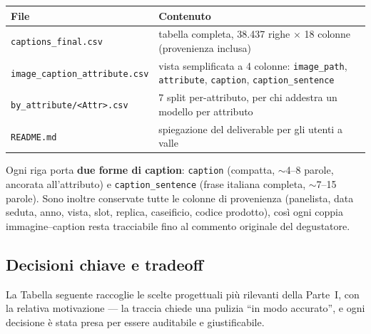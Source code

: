 \documentclass[11pt,a4paper]{article}
\begin{document}
\begin{center}\small
\begin{tabular}{@{}p{4.6cm} p{9.6cm}@{}}
\toprule
\textbf{File} & \textbf{Contenuto} \\
\midrule
\texttt{captions\_final.csv} & tabella completa, 38.437 righe $\times$ 18 colonne (provenienza inclusa) \\
\texttt{image\_caption\_attribute.csv} & vista semplificata a 4 colonne: \texttt{image\_path}, \texttt{attribute}, \texttt{caption}, \texttt{caption\_sentence} \\
\texttt{by\_attribute/<Attr>.csv} & 7 split per-attributo, per chi addestra un modello per attributo \\
\texttt{README.md} & spiegazione del deliverable per gli utenti a valle \\
\bottomrule
\end{tabular}
\end{center}

Ogni riga porta \textbf{due forme di caption}: \texttt{caption} (compatta,
$\sim$4--8 parole, ancorata all'attributo) e \texttt{caption\_sentence} (frase
italiana completa, $\sim$7--15 parole). Sono inoltre conservate tutte le
colonne di provenienza (panelista, data seduta, anno, vista, slot, replica,
caseificio, codice prodotto), cos\`i ogni coppia immagine--caption resta
tracciabile fino al commento originale del degustatore.

\subsection{Decisioni chiave e tradeoff}
La Tabella seguente raccoglie le scelte progettuali pi\`u rilevanti della
Parte~I, con la relativa motivazione --- la traccia chiede una pulizia ``in
modo accurato'', e ogni decisione \`e stata presa per essere auditabile e
giustificabile.
\end{document}
